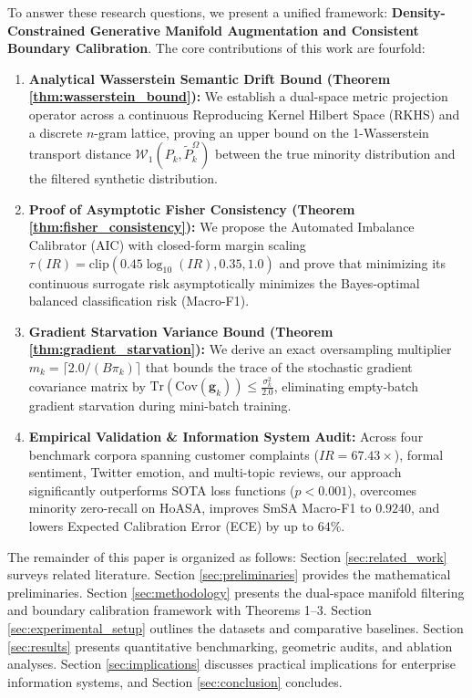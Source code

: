 \documentclass[final,5p,times,twocolumn]{elsarticle}
\begin{document}
To answer these research questions, we present a unified framework: \textbf{Density-Constrained Generative Manifold Augmentation and Consistent Boundary Calibration}. The core contributions of this work are fourfold:
\begin{enumerate}
    \item \textbf{Analytical Wasserstein Semantic Drift Bound (Theorem \ref{thm:wasserstein_bound}):} We establish a dual-space metric projection operator across a continuous Reproducing Kernel Hilbert Space (RKHS) and a discrete $n$-gram lattice, proving an upper bound on the 1-Wasserstein transport distance $\mathcal{W}_1(P_k, \tilde{P}_k^\Omega)$ between the true minority distribution and the filtered synthetic distribution.
    \item \textbf{Proof of Asymptotic Fisher Consistency (Theorem \ref{thm:fisher_consistency}):} We propose the Automated Imbalance Calibrator (AIC) with closed-form margin scaling $\tau(IR) = \mathrm{clip}(0.45 \log_{10}(IR), 0.35, 1.0)$ and prove that minimizing its continuous surrogate risk asymptotically minimizes the Bayes-optimal balanced classification risk (Macro-F1).
    \item \textbf{Gradient Starvation Variance Bound (Theorem \ref{thm:gradient_starvation}):} We derive an exact oversampling multiplier $m_k = \lceil 2.0 / (B \pi_k) \rceil$ that bounds the trace of the stochastic gradient covariance matrix by $\text{Tr}(\text{Cov}(\mathbf{g}_k)) \le \frac{\sigma_k^2}{2.0}$, eliminating empty-batch gradient starvation during mini-batch training.
    \item \textbf{Empirical Validation & Information System Audit:} Across four benchmark corpora spanning customer complaints ($IR=67.43\times$), formal sentiment, Twitter emotion, and multi-topic reviews, our approach significantly outperforms SOTA loss functions ($p < 0.001$), overcomes minority zero-recall on HoASA, improves SmSA Macro-F1 to $0.9240$, and lowers Expected Calibration Error (ECE) by up to $64\%$.
\end{enumerate}

The remainder of this paper is organized as follows: Section \ref{sec:related_work} surveys related literature. Section \ref{sec:preliminaries} provides the mathematical preliminaries. Section \ref{sec:methodology} presents the dual-space manifold filtering and boundary calibration framework with Theorems 1--3. Section \ref{sec:experimental_setup} outlines the datasets and comparative baselines. Section \ref{sec:results} presents quantitative benchmarking, geometric audits, and ablation analyses. Section \ref{sec:implications} discusses practical implications for enterprise information systems, and Section \ref{sec:conclusion} concludes.
\end{document}
